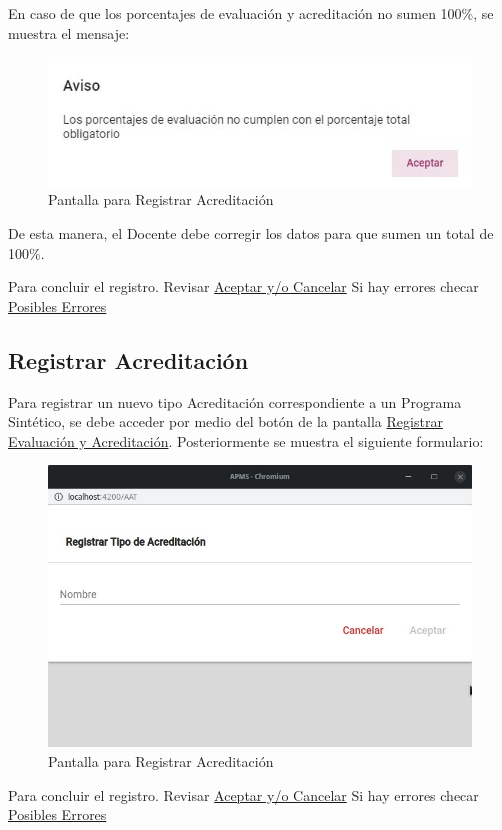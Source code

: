 En caso de que los porcentajes de evaluación y acreditación no sumen 100\%, se muestra el mensaje:


\begin{figure}[H]
    \centering
    \hypertarget{XXX}{\includegraphics[width=0.5\linewidth]{images/SP6/ErrorPorcentaje}}
    \caption{Pantalla para Registrar Acreditación}
\end{figure}

De esta manera, el Docente debe corregir los datos para que sumen un total de 100\%.

Para concluir el registro. Revisar \hyperlink{AceptarCancelar}{Aceptar y/o Cancelar}
Si hay errores checar \hyperlink{Errores}{Posibles Errores}

\pagebreak
\hypertarget{RegA}{\subsection{Registrar Acreditación}}

Para registrar un nuevo tipo Acreditación correspondiente a un Programa Sintético, se debe acceder por medio del botón  de la pantalla \hyperlink{RegEyA}{Registrar Evaluación y Acreditación}. Posteriormente se muestra el siguiente formulario: 


\begin{figure}[H]
    \centering
    \hypertarget{RegA}{\includegraphics[width=0.5\linewidth]{images/SP6/9.jpeg}}
    \caption{Pantalla para Registrar Acreditación}
\end{figure}



Para concluir el registro. Revisar \hyperlink{AceptarCancelar}{Aceptar y/o Cancelar}
Si hay errores checar \hyperlink{Errores}{Posibles Errores}